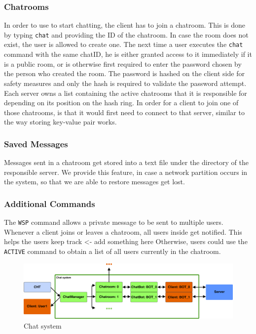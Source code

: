 \subsubsection{Chatrooms}
\label{sec:groupchat_funtionalities_chatcommand}
In order to use to start chatting, the client has to join a chatroom. This is done by typing \texttt{chat} and providing the ID of the chatroom. In case the room does not exist, the user is allowed to create one. The next time a user executes the \texttt{chat} command with the same chatID, he is either granted access to it immediately if it is a public room, or is otherwise first required to enter the password chosen by the person who created the room. The password is hashed on the client side for safety measures and only the hash is required to validate the password attempt.
Each server owns a list containing the active chatrooms that it is responsible for depending on its position on the hash ring. In order for a client to join one of those chatrooms, is that it would first need to connect to that server, similar to the way storing key-value pair works. 

\subsubsection{Saved Messages}
\label{sec:groupchat_funtionalities_savedmessages}
Messages sent in a chatroom get stored into a text file under the directory of the responsible server. We provide this feature, in case a network partition occurs in the system, so that we are able to restore messages get lost.

\subsubsection{Additional Commands}
\label{sec:groupchat_funtionalities_commands}
The \texttt{WSP} command allows a private message to be sent to multiple users.
Whenever a client joins or leaves a chatroom, all users inside get notified. This helps the users keep track <- add something here %
Otherwise, users could use the \texttt{ACTIVE} command to obtain a list of all users currently in the chatroom. 

\begin{figure}[h]
	\centering
	\includegraphics[width=\linewidth]{figures/chat/chat_arch.png}
	\caption{Chat system}
\end{figure}

